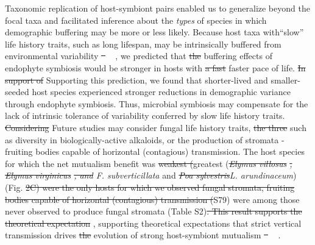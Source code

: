 \documentclass[lineno, sn-basic]{sn-jnl}%
\providecommand{\DIFadd}[1]{{\protect\color{blue}#1}} %
\providecommand{\DIFdel}[1]{{\protect\color{red}\protect\scriptsize\sout{#1}}}
\providecommand{\DIFadd}[1]{{\protect\color{blue}\uwave{#1}}} %
\providecommand{\DIFdel}[1]{{\protect\color{red}\sout{#1}}}                      %
\providecommand{\DIFaddbegin}{} %
\providecommand{\DIFaddend}{} %
\providecommand{\DIFdelbegin}{} %
\providecommand{\DIFdelend}{} %
\newcommand{\DIFscaledelfig}{0.5}
\newlength{\DIFdelgraphicswidth} %
\newlength{\DIFdelgraphicsheight} %
\newcommand{\DIFaddincludegraphics}[2][]{{\color{blue}\fbox{\DIFOincludegraphics[#1]{#2}}}} %
\newcommand{\DIFdelincludegraphics}[2][]{%
\sbox{\DIFdelgraphicsbox}{\DIFOincludegraphics[#1]{#2}}%
\settoboxwidth{\DIFdelgraphicswidth}{\DIFdelgraphicsbox} %
\settoboxtotalheight{\DIFdelgraphicsheight}{\DIFdelgraphicsbox} %
\scalebox{\DIFscaledelfig}{%
\parbox[b]{\DIFdelgraphicswidth}{\usebox{\DIFdelgraphicsbox}\\[-\baselineskip] \rule{\DIFdelgraphicswidth}{0em}}\llap{\resizebox{\DIFdelgraphicswidth}{\DIFdelgraphicsheight}{%
\setlength{\unitlength}{\DIFdelgraphicswidth}%
\begin{picture}(1,1)%
\thicklines\linethickness{2pt} %
{\color[rgb]{1,0,0}\put(0,0){\framebox(1,1){}}}%
{\color[rgb]{1,0,0}\put(0,0){\line( 1,1){1}}}%
{\color[rgb]{1,0,0}\put(0,1){\line(1,-1){1}}}%
\end{picture}%
}\hspace*{3pt}}} %
} %
\DeclareRobustCommand{\DIFaddbegin}{\DIFOaddbegin \let\includegraphics\DIFaddincludegraphics} %
\DeclareRobustCommand{\DIFaddend}{\DIFOaddend \let\includegraphics\DIFOincludegraphics} %
\DeclareRobustCommand{\DIFdelbegin}{\DIFOdelbegin \let\includegraphics\DIFdelincludegraphics} %
\DeclareRobustCommand{\DIFdelend}{\DIFOaddend \let\includegraphics\DIFOincludegraphics} %
\begin{document}
Taxonomic replication of host-symbiont pairs enabled us to generalize beyond the focal taxa and facilitated inference about the \emph{types} of species in which demographic buffering may be more or less likely. 
Because host taxa with``slow'' life history traits, such as long lifespan, may be intrinsically buffered from environmental variability \DIFdelbegin \DIFdel{\mbox{%
\cite{rees1996evolutionary,moles2004seedling,morris2008longevity}}\hspace{0pt}%
}\DIFdelend \DIFaddbegin \DIFadd{\mbox{%
\citep{rees1996evolutionary,moles2004seedling,morris2008longevity}}\hspace{0pt}%
}\DIFaddend , we predicted that \DIFdelbegin \DIFdel{the }\DIFdelend buffering effects of endophyte symbiosis would be stronger in hosts with \DIFdelbegin \DIFdel{a fast }\DIFdelend \DIFaddbegin \DIFadd{faster }\DIFaddend pace of life. 
\DIFdelbegin \DIFdel{In support of }\DIFdelend \DIFaddbegin \DIFadd{Supporting }\DIFaddend this prediction, we found that shorter-lived and smaller-seeded host species experienced stronger reductions in demographic variance through endophyte symbiosis. 
Thus, microbial symbiosis may compensate for the lack of intrinsic tolerance of variability conferred by slow life history traits.
\DIFdelbegin \DIFdel{Considering }\DIFdelend \DIFaddbegin \DIFadd{Future studies may consider }\DIFaddend fungal life history traits, \DIFdelbegin \DIFdel{the three }\DIFdelend \DIFaddbegin \DIFadd{such as diversity in biologically-active alkaloids, or the production of stromata - fruiting bodies capable of horizontal (contagious) transmission. 
The }\DIFaddend host species for which the net mutualism benefit was \DIFdelbegin \DIFdel{weakest (}\DIFdelend \DIFaddbegin \DIFadd{greatest (}\DIFaddend \emph{\DIFdelbegin \DIFdel{Elymus villosus}%
\DIFdel{, }\emph{\DIFdel{Elymus virginicus}}%
\DIFdel{, and }\DIFdelend \DIFaddbegin \DIFadd{F. subverticillata}} \DIFadd{and }\DIFaddend \emph{\DIFdelbegin \DIFdel{Poa sylvestris}\DIFdelend \DIFaddbegin \DIFadd{L. arundinaceum}\DIFaddend }) (Fig. \DIFdelbegin \DIFdel{2C) were the only hosts for which we observed fungal stromata, fruiting bodies capable of horizontal (contagious) transmission (}\DIFdelend \DIFaddbegin \DIFadd{S79) were among those never observed to produce fungal stromata (}\DIFaddend Table S2)\DIFdelbegin \DIFdel{. 
This result supports the theoretical expectation }\DIFdelend \DIFaddbegin \DIFadd{, supporting theoretical expectations }\DIFaddend that strict vertical transmission drives \DIFdelbegin \DIFdel{the }\DIFdelend evolution of strong host-symbiont mutualism \DIFdelbegin \DIFdel{\mbox{%
\cite{fine1975vectors,afkhami2008symbiosis}}\hspace{0pt}%
}\DIFdelend \DIFaddbegin \DIFadd{\mbox{%
\citep{fine1975vectors,afkhami2008symbiosis}}\hspace{0pt}%
}\DIFaddend . 
\end{document}
